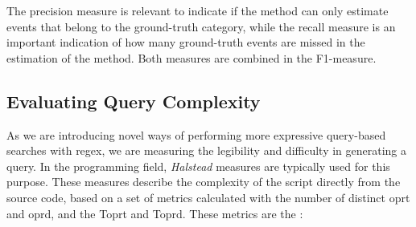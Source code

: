 %
%

The precision measure is relevant to indicate if the method can only estimate events that belong to the ground-truth category, while the recall measure is an important indication of how many ground-truth events are missed in the estimation of the method. Both measures are combined in the F1-measure.



\subsection{Evaluating Query Complexity}
\label{subsec:complex}

As we are introducing novel ways of performing more expressive query-based searches with \gls{regex}, we are measuring the legibility and difficulty in generating a query. In the programming field, \textit{Halstead} measures are typically used for this purpose. These measures describe the complexity of the script directly from the source code, based on a set of metrics calculated with the number of distinct \gls{oprt} and \gls{oprd}, and the \gls{Toprt} and \gls{Toprd}. These metrics are the \cite{Halstead2}:

